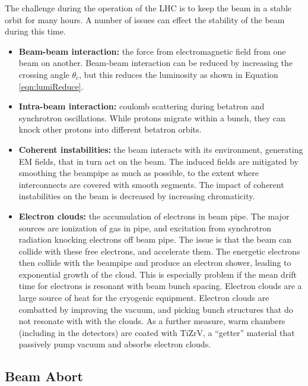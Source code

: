 The challenge during the operation of the LHC is to keep the beam in a stable orbit for many hours.
A number of issues can effect the stability of the beam during this time. \cite{lyndon}
\begin{itemize}
    \item \textbf{Beam-beam interaction:} the force from electromagnetic field from one beam on another. Beam-beam interaction can be reduced by increasing the crossing angle $\theta_c$, but this reduces the luminosity as shown in Equation \ref{eqn:lumiReduce}.
    \item \textbf{Intra-beam interaction:} coulomb scattering during betatron and synchrotron oscillations. While protons migrate within a bunch, they can knock other protons into different betatron orbits. 
    \item \textbf{Coherent instabilities:} the beam interacts with its environment, generating EM fields, that in turn act on the beam. The induced fields are mitigated by smoothing the beampipe as much as possible, to the extent where interconnects are covered with smooth segments. The impact of coherent instabilities on the beam is decreased by increasing chromaticity.
    \item \textbf{Electron clouds:} the accumulation of electrons in beam pipe. The major sources are ionization of gas in pipe, and excitation from synchrotron radiation knocking electrons off beam pipe. The issue is that the beam can collide with these free electrons, and accelerate them. The energetic electrons then collide with the beampipe and produce an electron shower, leading to exponential growth of the cloud. This is especially problem if the mean drift time for electrons is resonant with beam bunch spacing. Electron clouds are a large source of heat for the cryogenic equipment. Electron clouds are combatted by improving the vacuum, and picking bunch structures that do not resonate with with the clouds. As a further measure, warm chambers (including in the detectors) are coated with TiZrV, a ``getter'' material that passively pump vacuum and absorbs electron clouds.
\end{itemize}


\subsection{Beam Abort}

